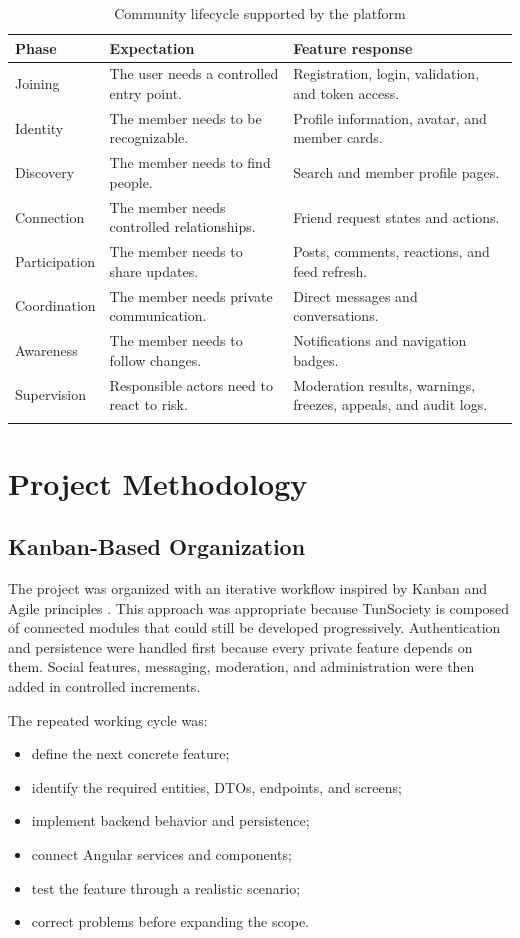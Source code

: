 \begin{longtable}{|m{3.1cm}|m{5.4cm}|m{5.7cm}|}
\hline
\textbf{Phase} & \textbf{Expectation} & \textbf{Feature response} \\
\hline
Joining & The user needs a controlled entry point. & Registration, login, validation, and token access. \\
\hline
Identity & The member needs to be recognizable. & Profile information, avatar, and member cards. \\
\hline
Discovery & The member needs to find people. & Search and member profile pages. \\
\hline
Connection & The member needs controlled relationships. & Friend request states and actions. \\
\hline
Participation & The member needs to share updates. & Posts, comments, reactions, and feed refresh. \\
\hline
Coordination & The member needs private communication. & Direct messages and conversations. \\
\hline
Awareness & The member needs to follow changes. & Notifications and navigation badges. \\
\hline
Supervision & Responsible actors need to react to risk. & Moderation results, warnings, freezes, appeals, and audit logs. \\
\hline
\caption{Community lifecycle supported by the platform}
\end{longtable}

\section{Project Methodology}

\subsection{Kanban-Based Organization}

The project was organized with an iterative workflow inspired by Kanban and Agile principles \cite{sommerville}. This approach was appropriate because TunSociety is composed of connected modules that could still be developed progressively. Authentication and persistence were handled first because every private feature depends on them. Social features, messaging, moderation, and administration were then added in controlled increments.

The repeated working cycle was:

\begin{itemize}
    \item define the next concrete feature;
    \item identify the required entities, DTOs, endpoints, and screens;
    \item implement backend behavior and persistence;
    \item connect Angular services and components;
    \item test the feature through a realistic scenario;
    \item correct problems before expanding the scope.
\end{itemize}

